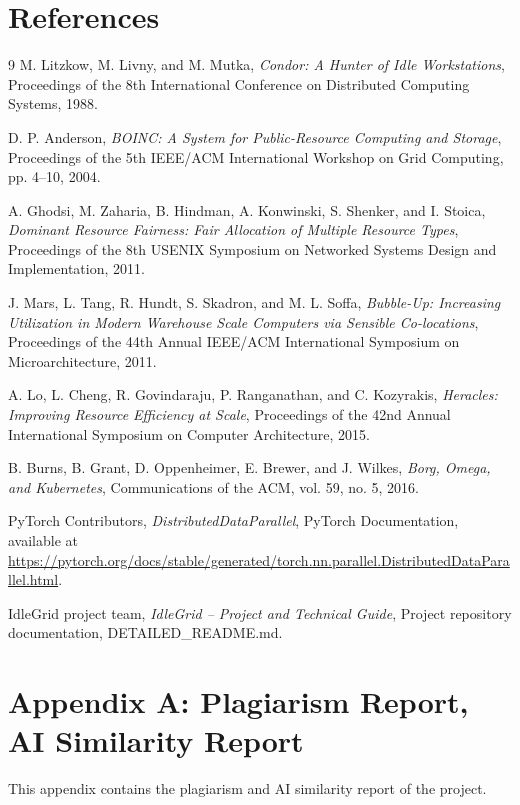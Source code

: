 \documentclass{article}
\begin{document}
	\pagebreak
	
	\section{References}
	\begin{thebibliography}{9}
M. Litzkow, M. Livny, and M. Mutka,
\textit{Condor: A Hunter of Idle Workstations},
Proceedings of the 8th International Conference on Distributed Computing Systems, 1988.

D. P. Anderson,
\textit{BOINC: A System for Public-Resource Computing and Storage},
Proceedings of the 5th IEEE/ACM International Workshop on Grid Computing, pp. 4--10, 2004.

A. Ghodsi, M. Zaharia, B. Hindman, A. Konwinski, S. Shenker, and I. Stoica,
\textit{Dominant Resource Fairness: Fair Allocation of Multiple Resource Types},
Proceedings of the 8th USENIX Symposium on Networked Systems Design and Implementation, 2011.

J. Mars, L. Tang, R. Hundt, S. Skadron, and M. L. Soffa,
\textit{Bubble-Up: Increasing Utilization in Modern Warehouse Scale Computers via Sensible Co-locations},
Proceedings of the 44th Annual IEEE/ACM International Symposium on Microarchitecture, 2011.

A. Lo, L. Cheng, R. Govindaraju, P. Ranganathan, and C. Kozyrakis,
\textit{Heracles: Improving Resource Efficiency at Scale},
Proceedings of the 42nd Annual International Symposium on Computer Architecture, 2015.

B. Burns, B. Grant, D. Oppenheimer, E. Brewer, and J. Wilkes,
\textit{Borg, Omega, and Kubernetes},
Communications of the ACM, vol. 59, no. 5, 2016.

PyTorch Contributors,
\textit{DistributedDataParallel},
PyTorch Documentation, available at \url{https://pytorch.org/docs/stable/generated/torch.nn.parallel.DistributedDataParallel.html}.

IdleGrid project team,
\textit{IdleGrid -- Project and Technical Guide},
Project repository documentation, DETAILED\_README.md.
\end{thebibliography} 

\pagebreak
\appendix
\section{Appendix A: Plagiarism Report, AI Similarity Report}
This appendix contains the plagiarism and AI similarity report of the project. 
\end{document}
